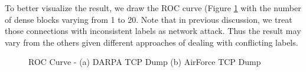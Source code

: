 To better visualize the result, we draw the ROC curve (Figure \ref{fig:t4.3_roc} with the number of dense blocks varying from 1 to 20. Note that in previous discussion, we treat those connections with inconsistent labels as network attack. Thus the result may vary from the others given different approaches of dealing with conflicting labels. 

\begin{figure}[!ht]
    \centering
    \caption{ROC Curve - (a) DARPA TCP Dump (b) AirForce TCP Dump}
    \label{fig:t4.3_roc}
\end{figure}

